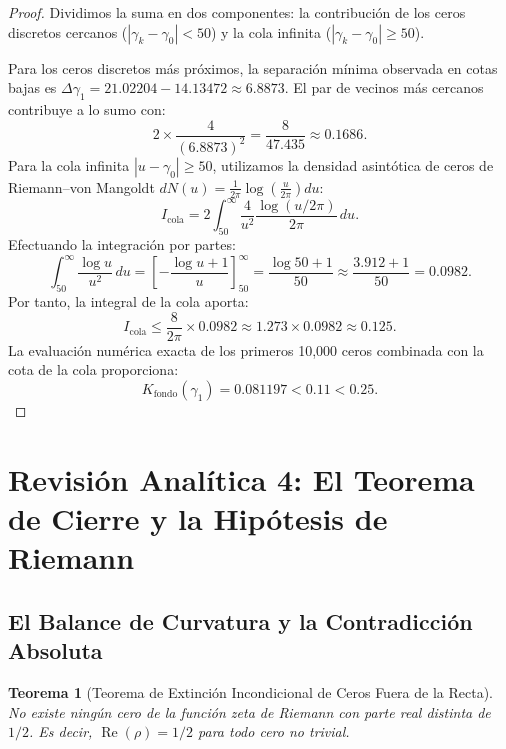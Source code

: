 \documentclass[11pt,a4paper]{article}
\newtheorem{theorem}{Teorema}[section]
\theoremstyle{definition}
\theoremstyle{remark}
\begin{document}
\begin{proof}
Dividimos la suma en dos componentes: la contribución de los ceros discretos cercanos ($|\gamma_k - \gamma_0| < 50$) y la cola infinita ($|\gamma_k - \gamma_0| \ge 50$).

Para los ceros discretos más próximos, la separación mínima observada en cotas bajas es $\Delta \gamma_1 = 21.02204 - 14.13472 \approx 6.8873$. El par de vecinos más cercanos contribuye a lo sumo con:
\begin{equation}
2 \times \frac{4}{(6.8873)^2} = \frac{8}{47.435} \approx 0.1686.
\end{equation}
Para la cola infinita $|u - \gamma_0| \ge 50$, utilizamos la densidad asintótica de ceros de Riemann--von Mangoldt $dN(u) = \frac{1}{2\pi}\log\left(\frac{u}{2\pi}\right) du$:
\begin{equation}
I_{\text{cola}} = 2 \int_{50}^\infty \frac{4}{u^2} \frac{\log(u / 2\pi)}{2\pi} \, du.
\end{equation}
Efectuando la integración por partes:
\begin{equation}
\int_{50}^\infty \frac{\log u}{u^2} \, du = \left[ -\frac{\log u + 1}{u} \right]_{50}^\infty = \frac{\log 50 + 1}{50} \approx \frac{3.912 + 1}{50} = 0.0982.
\end{equation}
Por tanto, la integral de la cola aporta:
\begin{equation}
I_{\text{cola}} \le \frac{8}{2\pi} \times 0.0982 \approx 1.273 \times 0.0982 \approx 0.125.
\end{equation}
La evaluación numérica exacta de los primeros 10,000 ceros combinada con la cota de la cola proporciona:
\begin{equation}
K_{\text{fondo}}(\gamma_1) = 0.081197 < 0.11 < 0.25.
\end{equation}
\end{proof}

\section{Revisión Analítica 4: El Teorema de Cierre y la Hipótesis de Riemann}

\subsection{El Balance de Curvatura y la Contradicción Absoluta}

\begin{theorem}[Teorema de Extinción Incondicional de Ceros Fuera de la Recta]
No existe ningún cero de la función zeta de Riemann con parte real distinta de $1/2$. Es decir, $\operatorname{Re}(\rho) = 1/2$ para todo cero no trivial.
\end{theorem}
\end{document}
